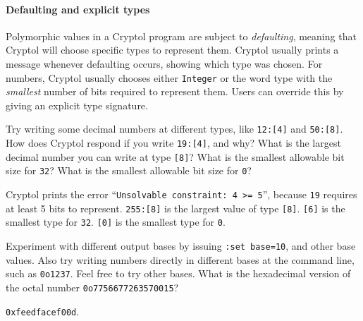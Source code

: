 \paragraph*{Defaulting and explicit types}\indDefaulting
Polymorphic values in a Cryptol program are subject to
\emph{defaulting}, meaning that Cryptol will choose specific types to
represent them. Cryptol usually prints a message whenever defaulting
occurs, showing which type was chosen. For numbers, Cryptol usually
chooses either \texttt{Integer} or the word type with the
\emph{smallest} number of bits required to represent them. Users can
override this by giving an explicit type signature.\indSignature


\begin{Exercise}\label{ex:decimalType}
  Try writing some decimal numbers at different types, like
  \texttt{12:[4]} and \texttt{50:[8]}. How does Cryptol respond if
  you write \texttt{19:[4]}, and why? What is the largest decimal
  number you can write at type \texttt{[8]}? What is the smallest
  allowable bit size for \texttt{32}? What is the smallest allowable
  bit size for \texttt{0}?
\end{Exercise}
\begin{Answer}
  Cryptol prints the error ``\texttt{Unsolvable constraint: 4 >= 5}'',
  because \texttt{19} requires at least 5 bits to represent.
  \texttt{255:[8]} is the largest value of type \texttt{[8]}.
  \texttt{[6]} is the smallest type for \texttt{32}. \texttt{[0]} is
  the smallest type for \texttt{0}.
\end{Answer}

\begin{Exercise}\label{ex:setBase}
  Experiment with different output bases by issuing {\tt :set
    base=10}, and other base values. Also try writing numbers directly
  in different bases at the command line, such as {\tt 0o1237}.  Feel
  free to try other bases.  What is the hexadecimal version of the
  octal number {\tt 0o7756677263570015}?
\end{Exercise}
\begin{Answer}
{\tt 0xfeedfacef00d}.
\end{Answer}

